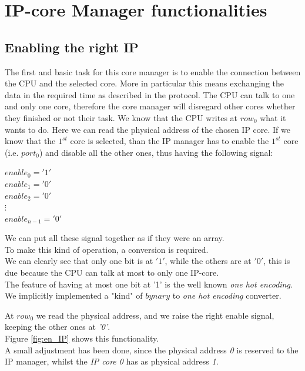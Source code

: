 \chapter{IP-core Manager functionalities}
\label{chap1}
\section{Enabling the right IP}
The first and basic task for this core manager is to enable the connection between the CPU and the selected core. More in particular this means exchanging the data in the required time as described in the protocol. The CPU can talk to one and only one core, therefore the core manager will disregard other cores whether they finished or not their task.
We know that the CPU writes at $ row_{0} $ what it wants to do. Here we can read the physical address of the chosen IP core.
If we know that the $ 1^{st} $ core is selected, than the IP manager has to enable the $ 1^{st} $ core (i.e. $port_{0}  $) and disable all the other ones, thus having the following signal:\\
\begin{center}
	$ enable_0='1' $\\
$ enable_1='0' $\\
$ enable_2='0' $\\
$  \vdots $\\
$ enable_{n-1}='0' $
\end{center}
\bigskip
We can put all these signal together as if they were an array.\\
\bigskip
To make this kind of operation, a conversion is required.\\
We can clearly see that only one bit is at $ '1' $, while the others are at $ '0' $, this is due because the CPU can talk at most to only one IP-core.\\
The feature of having at most one bit at '1' is the well known \textit{one hot encoding}.\\
We implicitly implemented a "kind" of $ bynary $ to \textit{one hot encoding} converter.

At $ row_0 $ we read the physical address, and we raise the right enable signal, keeping the other ones at \textit{'0'}.\\
Figure \ref{fig:en_IP} shows this functionality.\\
\bigskip
A small adjustment has been done, since the physical address \textit{0} is reserved to the IP manager, whilst the  \textit{IP core 0 } has as physical address \textit{1}.

